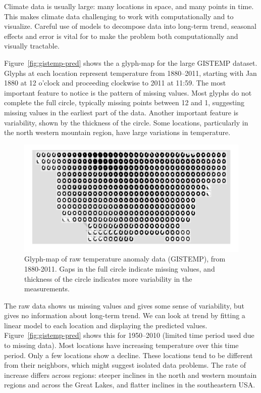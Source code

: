 \documentclass[oneside]{article}
\begin{document}
Climate data is usually large: many locations in space, and many points in time. This makes climate data challenging to work with computationally and to visualize. Careful use of models to decompose data into long-term trend, seasonal effects and error is vital for to make the problem both computationally and visually tractable.

Figure~\ref{fig:gistemp-pred} shows the a glyph-map for the large GISTEMP dataset. Glyphs at each location represent temperature from 1880--2011, starting with Jan 1880 at 12 o'clock and proceeding clockwise to 2011 at 11:59. The most important feature to notice is the pattern of missing values. Most glyphs do not complete the full circle, typically missing points between 12 and 1, suggesting missing values in the earliest part of the data. Another important feature is variability, shown by the thickness of the circle. Some locations, particularly in the north western mountain region, have large variations in temperature. 

\begin{figure}[htbp]
  \centering

  \includegraphics[width=1\linewidth]{gistemp-polar-raw}

  \caption{Glyph-map of raw temperature anomaly data (GISTEMP), from 1880-2011. Gaps in the full circle indicate missing values, and thickness of the circle indicates more variability in the measurements.}
  \label{fig:gistemp-raw}
\end{figure}

The raw data shows us missing values and gives some sense of variability, but gives no information about long-term trend. We can look at trend by fitting a linear model to each location and displaying the predicted values. Figure~\ref{fig:gistemp-pred} shows this for 1950--2010 (limited time period used due to missing data). Most locations have increasing temperature over this time period. Only a few locations show a decline. These locations tend to be different from their neighbors, which might suggest isolated data problems. The rate of increase differs across regions: steeper inclines in the north and western mountain regions and across the Great Lakes, and flatter inclines in the southeastern USA.
\end{document}
